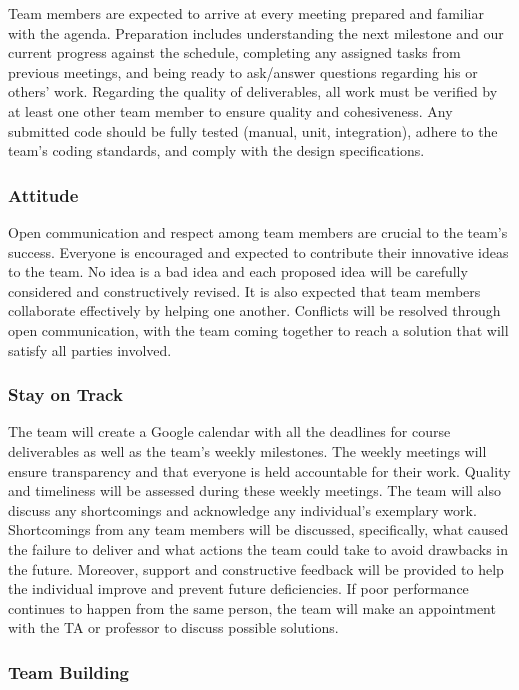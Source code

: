 \documentclass{article}
\begin{document}
Team members are expected to arrive at every meeting prepared and familiar with the agenda. Preparation includes understanding the next milestone and our current progress against the schedule, completing any assigned tasks from previous meetings, and being ready to ask/answer questions regarding his or others’ work. Regarding the quality of deliverables, all work must be verified by at least one other team member to ensure quality and cohesiveness. Any submitted code should be fully tested (manual, unit, integration), adhere to the team’s coding standards, and comply with the design specifications.
\subsubsection*{Attitude}

Open communication and respect among team members are crucial to the team’s success. Everyone is encouraged and expected to contribute their innovative ideas to the team. No idea is a bad idea and each proposed idea will be carefully considered and constructively revised. It is also expected that team members collaborate effectively by helping one another. Conflicts will be resolved through open communication, with the team coming together to reach a solution that will satisfy all parties involved.

\subsubsection*{Stay on Track}

The team will create a Google calendar with all the deadlines for course deliverables as well as the team’s weekly milestones. The weekly meetings will ensure transparency and that everyone is held accountable for their work. Quality and timeliness will be assessed during these weekly meetings. The team will also discuss any shortcomings and acknowledge any individual’s exemplary work. Shortcomings from any team members will be discussed, specifically, what caused the failure to deliver and what actions the team could take to avoid drawbacks in the future. Moreover, support and constructive feedback will be provided to help the individual improve and prevent future deficiencies. If poor performance continues to happen from the same person, the team will make an appointment with the TA or professor to discuss possible solutions.

\subsubsection*{Team Building}
\end{document}

